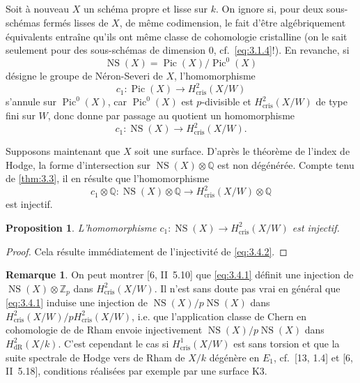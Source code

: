 \documentclass[12pt,a4paper]{article}
\theoremstyle{plain}
\newtheorem{proposition}[theorem]{Proposition}
\theoremstyle{definition}
\newtheorem{remark}[theorem]{Remarque}
\theoremstyle{remark}
\DeclareMathOperator{\Pic}{Pic}
\DeclareMathOperator{\NS}{NS}
\newcommand{\cris}{\mathrm{cris}}
\begin{document}
\subsection{}

Soit à nouveau $X$ un schéma propre et lisse sur $k$. On ignore si, pour deux sous-schémas fermés lisses de $X$, de même codimension, le fait d'être algébriquement équivalents entraîne qu'ils ont même classe de cohomologie cristalline (on le sait seulement pour des sous-schémas de dimension $0$, cf.~\eqref{eq:3.1.4}!). En revanche, si
\[
\NS(X) = \Pic(X)/\Pic^0(X)
\]
désigne le groupe de Néron-Severi de $X$, l'homomorphisme
\[
c_1: \Pic(X) \to H^2_{\cris}(X/W)
\]
s'annule sur $\Pic^0(X)$, car $\Pic^0(X)$ est $p$-divisible et $H^2_{\cris}(X/W)$ de type fini sur $W$, donc donne par passage au quotient un homomorphisme
\begin{equation}\label{eq:3.4.1}
c_1: \NS(X) \to H^2_{\cris}(X/W).
\end{equation}

Supposons maintenant que $X$ soit une surface. D'après le théorème de l'index de Hodge, la forme d'intersection sur $\NS(X) \otimes \mathbb{Q}$ est non dégénérée. Compte tenu de \ref{thm:3.3}, il en résulte que l'homomorphisme
\begin{equation}\label{eq:3.4.2}
c_1 \otimes \mathbb{Q}: \NS(X) \otimes \mathbb{Q} \to H^2_{\cris}(X/W) \otimes \mathbb{Q}
\end{equation}
est injectif.

\begin{proposition}\label{prop:3.4}
L'homomorphisme $c_1: \NS(X) \to H^2_{\cris}(X/W)$ est injectif.
\end{proposition}

\begin{proof}
Cela résulte immédiatement de l'injectivité de \eqref{eq:3.4.2}.
\end{proof}

\begin{remark}\label{rem:3.5}
On peut montrer [6, II~5.10] que \eqref{eq:3.4.1} définit une injection de $\NS(X) \otimes \mathbb{Z}_p$ dans $H^2_{\cris}(X/W)$. Il n'est sans doute pas vrai en général que \eqref{eq:3.4.1} induise une injection de $\NS(X)/p\NS(X)$ dans $H^2_{\cris}(X/W)/pH^2_{\cris}(X/W)$, i.e. que l'application classe de Chern en cohomologie de de Rham envoie injectivement $\NS(X)/p\NS(X)$ dans $H^2_{\mathrm{dR}}(X/k)$. C'est cependant le cas si $H^1_{\cris}(X/W)$ est sans torsion et que la suite spectrale de Hodge vers de Rham de $X/k$ dégénère en $E_1$, cf.~[13, 1.4] et [6, II~5.18], conditions réalisées par exemple par une surface K3.
\end{remark}
\end{document}
